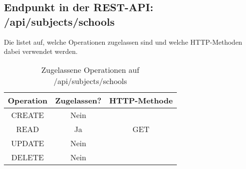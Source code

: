 \subsection{Endpunkt in der REST-API: /api/subjects/schools}
Die  listet auf, welche Operationen zugelassen sind und welche HTTP-Methoden dabei verwendet werden. 

\begin{table}[!htbp]
	\begin{tabular}{|c|c|c|}
		\hline
			\textbf{Operation} & \textbf{Zugelassen?} & \textbf{HTTP-Methode} \\ \hline
			CREATE & Nein & \\ \hline 
			READ & Ja & GET \\ \hline
			UPDATE & Nein & \\ \hline 
			DELETE & Nein & \\ \hline
	\end{tabular}

		\caption{Zugelassene Operationen auf /api/subjects/schools}
		\label{tab:end:rest:api:subjects:schools:meth}
\end{table}


